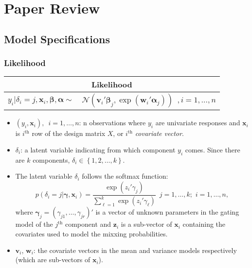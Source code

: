 \documentclass[11pt]{article}
\newcommand{\bs}{\boldsymbol}
\begin{document}
\section{Paper Review}
\subsection{Model Specifications}
\subsubsection{Likelihood}
\begin{table}[!htbp]
\centering
  \begin{tabular}{*2c}
    \toprule
    \multicolumn{2}{c}{\textbf{Likelihood}}\\
    \midrule
    $y_{i}|\delta_{i}=j, \bs{x}_{i}, \bs{\beta}, \bs{\alpha} \sim$ & $\mathcal{N}\left(\bs{v}_{i}'\bs{\beta}_{j}, \exp \left(\bs{w}_{i}'\bs{\alpha}_{j} \right) \right)\,\,\, ,i=1, \ldots , n $\\
    \bottomrule
  \end{tabular}
\end{table}
\begin{itemize}
  \item \textcolor{myblue}{$\left(y_{i}, \bs{x}_{i} \right), \,\,\, i=1, \ldots, n$}: n observations where $y_{i}$ are univariate responses and $\bs{x}_{i}$ is $i^{\text{th}}$ row of the design matrix $X$, or $i^{\text{th}}$ \emph{covariate vector}.
  \item \textcolor{myblue}{$\delta_{i}$}: a latent variable indicating from which component $y_{i}$ comes. Since there are $k$ components, $\delta_{i} \in \left\{1, 2, \ldots , k \right\}$.
  \item The latent variable $\delta_{i}$ follows the \textcolor{myorange}{softmax function}:
  $$
    p\left(\delta_{i}=j|\bs{\gamma}, \bs{x}_{i} \right) = \frac{\exp \left(z_{i}'\gamma_{j} \right)}{\sum_{\ell=1}^{k} \exp \left(z_{i}'\gamma_{\ell} \right)}\,\,\, j=1, \ldots , k; \,\, i = 1, \ldots, n,
  $$
  where $\bs{\gamma}_{j} = \left(\gamma_{j1}, \ldots , \gamma_{jr} \right)'$ is a vector of unknown parameters in the gating model of the $j^{\text{th}}$ component and $\bs{z}_{i}$ is a sub-vector of $\bs{x}_{i}$ containing the covariates used to model the mixxing probabilities.
  \item \textcolor{myblue}{$\bs{v}_{i}$, $\bs{w}_{i}$}: the covariate vectors in the mean and variance models respectively (which are sub-vectors of $\bs{x}_{i}$).
\end{itemize}
\end{document}
